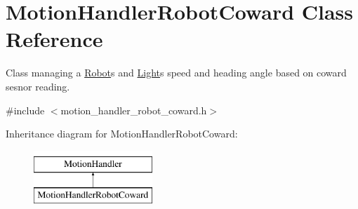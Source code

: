 \hypertarget{class_motion_handler_robot_coward}{}\section{Motion\+Handler\+Robot\+Coward Class Reference}
\label{class_motion_handler_robot_coward}


Class managing a \mbox{\hyperlink{class_robot}{Robot}}\textquotesingle{}s and \mbox{\hyperlink{class_light}{Light}}\textquotesingle{}s speed and heading angle based on coward sesnor reading.  




{\ttfamily \#include $<$motion\+\_\+handler\+\_\+robot\+\_\+coward.\+h$>$}

Inheritance diagram for Motion\+Handler\+Robot\+Coward\+:\begin{figure}[H]
\begin{center}
\leavevmode
\includegraphics[height=2.000000cm]{class_motion_handler_robot_coward}
\end{center}
\end{figure}
